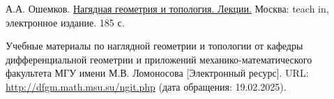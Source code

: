 \begin{thebibliography}{2}
    А.А. Ошемков. \href{https://teach-in.ru/file/synopsis/pdf/visual-geometry-and-topology-oshemkov-M.pdf}{Нагядная геометрия и топология. Лекции.} Москва: teach in, электронное издание. 185 с.
    
    Учебные материалы по наглядной геометрии и топологии от кафедры дифференциальной геометрии и приложений механико-математического факультета МГУ имени М.В. Ломоносова [Электронный ресурс]. URL: \href{http://dfgm.math.msu.su/ngit.php}{http://dfgm.math.msu.su/ngit.php} (дата обращения: 19.02.2025).

\end{thebibliography}